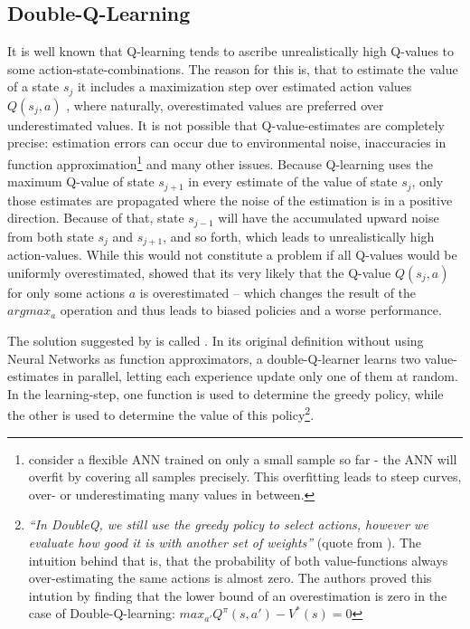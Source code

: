 \subsection{Double-Q-Learning}
It is well known that Q-learning tends to ascribe unrealistically high Q-values to some action-state-combinations. The reason for this is, that to estimate the value of a state $s_j$ it includes a maximization step over estimated action values $Q(s_j,a)$ , where naturally, overestimated values are preferred over underestimated values. 
It is not possible that Q-value-estimates are completely precise: estimation errors can occur due to environmental noise, inaccuracies in function approximation\footnote{consider a flexible ANN trained on only a small sample so far - the ANN will overfit by covering all samples precisely. This overfitting leads to steep curves, over- or underestimating many values in between.} and many other issues. Because Q-learning uses the maximum Q-value of state $s_{j+1}$ in every estimate of the value of state $s_j$, only those estimates are propagated where the noise of the estimation is in a positive direction. Because of that, state $s_{j-1}$ will have the accumulated upward noise from both state $s_j$ and $s_{j+1}$, and so forth, which leads to unrealistically high action-values. While this would not constitute a problem if all Q-values would be uniformly overestimated, \cite{van_hasselt_deep_2015} showed that its very likely that the Q-value $Q(s_j,a)$ for only some actions $a$ is overestimated -- which changes the result of the $argmax_a$ operation and thus leads to biased policies and a worse performance.

The solution suggested by \cite{van_hasselt_deep_2015} is called . In its original definition without using Neural Networks as function approximators, a double-Q-learner learns two value-estimates in parallel, letting each experience update only one of them at random. In the learning-step, one function is used to determine the greedy policy, while the other is used to determine the value of this policy\footnote{\textit{``In DoubleQ, we still use the greedy policy to select actions, however we evaluate how good it is with another set of weights''} (quote from \cite{van_hasselt_deep_2015}). The intuition behind that is, that the probability of both value-functions always over-estimating the same actions is almost zero. The authors proved this intution by finding that the lower bound of an overestimation is zero in the case of Double-Q-learning: $max_{a'}Q^\pi(s,a') - V^*(s) = 0$}.\\

